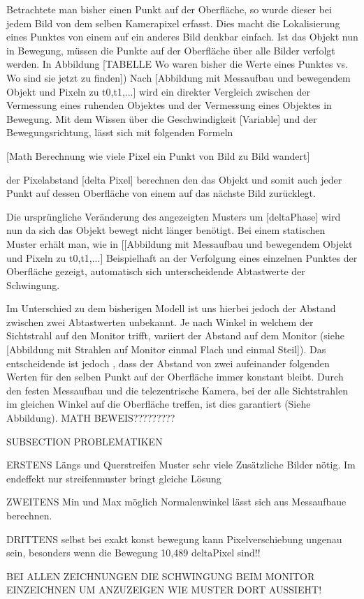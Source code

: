 Betrachtete man bisher einen Punkt auf der Oberfläche, so wurde dieser bei jedem Bild von dem selben Kamerapixel erfasst. Dies macht die Lokalisierung eines Punktes von einem auf ein anderes Bild denkbar einfach. Ist das Objekt nun in Bewegung, müssen die Punkte auf der Oberfläche über alle Bilder verfolgt werden. In Abbildung [TABELLE Wo waren bisher die Werte eines Punktes vs. Wo sind sie jetzt zu finden]) Nach [Abbildung mit Messaufbau und bewegendem Objekt und Pixeln zu t0,t1,...] wird ein direkter Vergleich zwischen der Vermessung eines ruhenden Objektes und der Vermessung eines Objektes in Bewegung. Mit dem Wissen über die Geschwindigkeit [Variable] und der Bewegungsrichtung, lässt sich mit folgenden Formeln

[Math Berechnung wie viele Pixel ein Punkt von Bild zu Bild wandert]

der Pixelabstand [delta Pixel] berechnen den das Objekt und somit auch jeder Punkt auf dessen Oberfläche von einem auf das nächste Bild zurücklegt. 

Die ursprüngliche Veränderung des angezeigten Musters um [deltaPhase] wird nun da sich das Objekt bewegt nicht länger benötigt. Bei einem statischen Muster erhält man, wie in [[Abbildung mit Messaufbau und bewegendem Objekt und Pixeln zu t0,t1,...] Beispielhaft an der Verfolgung eines einzelnen Punktes der Oberfläche gezeigt, automatisch sich unterscheidende Abtastwerte der Schwingung.

Im Unterschied zu dem bisherigen Modell ist uns hierbei jedoch der Abstand zwischen zwei Abtastwerten unbekannt. Je nach Winkel in welchem der Sichtstrahl auf den Monitor trifft, variiert der Abstand auf dem Monitor (siehe [Abbildung mit Strahlen auf Monitor einmal Flach und einmal Steil]). Das entscheidende ist jedoch , dass der Abstand von zwei aufeinander folgenden Werten für den selben Punkt auf der Oberfläche immer konstant bleibt. Durch den festen Messaufbau und die telezentrische Kamera, bei der alle Sichtstrahlen im gleichen Winkel auf die Oberfläche treffen, ist dies garantiert (Siehe Abbildung). MATH BEWEIS?????????





SUBSECTION PROBLEMATIKEN

ERSTENS Längs und Querstreifen Muster sehr viele Zusätzliche Bilder nötig. Im endeffekt nur streifenmuster bringt gleiche Lösung

ZWEITENS Min und Max möglich Normalenwinkel lässt sich aus Messaufbaue berechnen.

DRITTENS selbst bei exakt konst bewegung kann Pixelverschiebung ungenau sein, besonders wenn die Bewegung 10,489 deltaPixel sind!!

BEI ALLEN ZEICHNUNGEN DIE SCHWINGUNG BEIM MONITOR EINZEICHNEN UM ANZUZEIGEN WIE MUSTER DORT AUSSIEHT!

